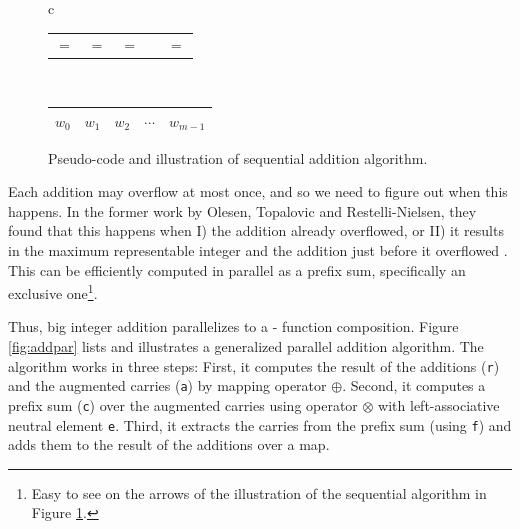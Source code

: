 \begin{figure}
\begin{minipage}{0.45\textwidth}
\begin{tabular}{c}
      \begin{tabular}{C{0.7cm}C{0.7cm}C{0.8cm}C{0.7cm}C{0.7cm}}
        $=$ & $=$ & $=$ &  & $=$  
      \end{tabular}\\
      \begin{tabular}{|C{0.7cm}|C{0.7cm}|C{0.7cm}|C{0.7cm}|C{0.7cm}|}
        \hline
        $w_{0}$ & $w_1$ & $w_2$ & $\cdots$ & $w_{m-1}$\\
        \hline
      \end{tabular}
    \end{tabular}
  \end{minipage}
  \caption{\footnotesize Pseudo-code and illustration of sequential addition algorithm.}
  \label{fig:addseq}
\end{figure}

Each addition may overflow at most once, and so we need to figure out when this
happens. In the former work by Olesen, Topalovic and Restelli-Nielsen, they
found that this happens when I) the addition already overflowed, or II) it
results in the maximum representable integer and the addition just before it
overflowed \cite{DPPproject}. This can be efficiently computed in parallel as a
prefix sum, specifically an exclusive one\footnote{Easy to see on the arrows of
  the illustration of the sequential algorithm in Figure \ref{fig:addseq}.}.

Thus, big integer addition parallelizes to a - function
composition. Figure \ref{fig:addpar} lists and illustrates a generalized
parallel addition algorithm. The algorithm works in three steps: First, it
computes the result of the additions (\texttt{r}) and the augmented carries
(\texttt{a}) by mapping operator $\oplus$. Second, it computes a prefix sum
(\texttt{c}) over the augmented carries using operator $\otimes$ with left-associative
neutral element \texttt{e}. Third, it extracts the carries from the prefix sum
(using \texttt{f}) and adds them to the result of the additions over a map.

